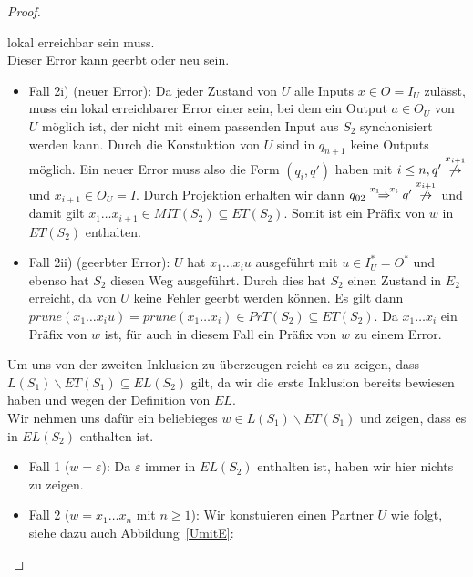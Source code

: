 \begin{proof}
\begin{itemize}
      lokal erreichbar sein muss.\\
      Dieser Error kann geerbt oder neu sein.\\
      \begin{itemize}
        \item Fall 2i) (neuer Error): Da jeder Zustand von $U$ alle Inputs $x\in
          O=I_U$ zulässt, muss ein lokal erreichbarer Error einer sein, bei dem
          ein Output $a\in O_U$ von $U$ möglich ist, der nicht mit einem
          passenden Input aus $S_2$ synchonisiert werden kann. Durch die
          Konstuktion von $U$ sind in $q_{n+1}$ keine Outputs möglich. Ein
          neuer Error muss also die Form $(q_i,q')$ haben mit $i\leq n, q'
          \overset{x_{i+1}}{\not{\hspace{-0.1cm}\rightarrow}}$ und $x_{i+1}\in
          O_U=I$. Durch Projektion erhalten wir dann $q_{02} \overset{x_1\dots
          x_i}{\Rightarrow} q'
          \overset{x_{i+1}}{\not{\hspace{-0.1cm}\rightarrow}}$ und damit gilt
          $x_1\dots x_{i+1}\in MIT(S_2)\subseteq ET(S_2)$. Somit ist ein Präfix
          von $w$ in $ET(S_2)$ enthalten.
        \item Fall 2ii) (geerbter Error): $U$ hat $x_1\dots x_i u$ ausgeführt
          mit $u\in I_U^*=O^*$ und ebenso hat $S_2$ diesen Weg ausgeführt.
          Durch dies hat $S_2$ einen Zustand in $E_2$ erreicht, da von $U$
          keine Fehler geerbt werden können. Es gilt dann $prune(x_1\dots
          x_iu)=prune(x_1\dots x_i)\in PrT(S_2)\subseteq ET(S_2)$. Da $x_1\dots
          x_i$ ein Präfix von $w$ ist, für auch in diesem Fall ein Präfix von
          $w$ zu einem Error.
      \end{itemize}
  \end{itemize}
  Um uns von der zweiten Inklusion zu überzeugen reicht es zu zeigen, dass
  $L(S_1)\backslash ET(S_1)\subseteq EL(S_2)$ gilt, da wir die erste Inklusion
  bereits bewiesen haben und wegen der Definition von $EL$.\\
  Wir nehmen uns dafür ein beliebieges $w\in L(S_1)\backslash ET(S_1)$ und
  zeigen, dass es in $EL(S_2)$ enthalten ist.
  \begin{itemize}
    \item Fall 1 ($w=\varepsilon$): Da $\varepsilon$ immer in $EL(S_2)$
      enthalten ist, haben wir hier nichts zu zeigen.
    \item Fall 2 ($w=x_1\dots x_n$ mit $n\geq 1$): Wir konstuieren einen
      Partner $U$ wie folgt, siehe dazu auch Abbildung~\ref{UmitE}:

\end{itemize}
\end{proof}
